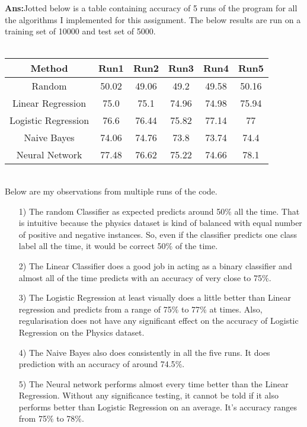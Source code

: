 \documentclass[11pt]{article}
\begin{document}
\textbf{Ans:}Jotted below is a table containing accuracy of 5 runs of the program for all the algorithms I implemented for this assignment. The below results are run on a training set of 10000 and test set of 5000.\\
\vspace{0.5 cm}\\
\begin{tabular}{|c|c|c|c|c|c|}
\hline 
\textbf{Method} & \textbf{Run1} & \textbf{Run2} & \textbf{Run3} & \textbf{Run4} & \textbf{Run5} \\ 
\hline 
\hline
Random & 50.02 & 49.06 & 49.2 & 49.58 & 50.16 \\ 
\hline 
Linear Regression & 75.0 & 75.1 & 74.96 & 74.98 & 75.94 \\ 
\hline 
Logistic Regression & 76.6 & 76.44 & 75.82 & 77.14 & 77 \\ 
\hline 
Naive Bayes & 74.06 & 74.76 & 73.8 & 73.74 & 74.4 \\ 
\hline 
Neural Network & 77.48 & 76.62 & 75.22 & 74.66 & 78.1 \\ 
\hline 
\end{tabular} \\
\vspace{0.4 cm}
Below are my observations from multiple runs of the code.
\begin{itemize}
\item[1)] The random Classifier as expected predicts around 50$\%$ all the time. That is intuitive because the physics dataset is kind of balanced with equal number of positive and negative instances. So, even if the classifier predicts one class label all the time, it would be correct 50$\%$ of the time.
\item[2)] The Linear Classifier does a good job in acting as a binary classifier and almost all of the time predicts with an accuracy of very close to 75$\%$.
\item[3)] The Logistic Regression at least visually does a little better than Linear regression and predicts from a range of 75$\%$ to 77$\%$ at times. Also, regularisation does not have any significant effect on the accuracy of Logistic Regression on the Physics dataset.\\
\item[4)] The Naive Bayes also does consistently in all the five runs. It does prediction with an accuracy of around 74.5$\%$. 
\item[5)] The Neural network performs almost every time better than the Linear Regression. Without any significance testing, it cannot be told if it also performs better than Logistic Regression on an average. It's accuracy ranges from 75$\%$ to 78$\%$.   
\end{itemize}
 
\end{document}
